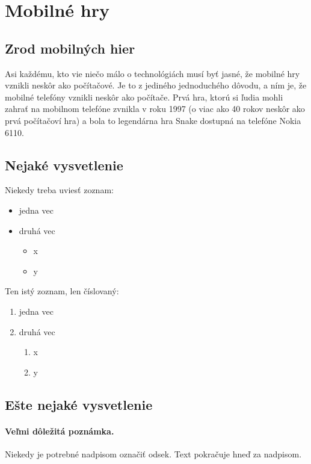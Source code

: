 \documentclass[10pt,twoside,slovak,a4paper]{article}
\begin{document}
\section{Mobilné hry} \label{ina}

\subsection{Zrod mobilných hier}

Asi každému, kto vie niečo málo o technológiách musí byť jasné, že mobilné hry vznikli neskôr ako počítačové. Je to z jediného jednoduchého dôvodu, a ním je, že mobilné telefóny vznikli neskôr ako počítače. Prvá hra, ktorú si ľudia mohli zahrať na mobilnom telefóne zvnikla v roku 1997 (o viac ako 40 rokov neskôr ako prvá počítačoví hra) a bola to legendárna hra Snake dostupná na telefóne Nokia 6110.


\subsection{Nejaké vysvetlenie} \label{ina:nejake}

Niekedy treba uviesť zoznam:

\begin{itemize}
\item jedna vec
\item druhá vec
	\begin{itemize}
	\item x
	\item y
	\end{itemize}
\end{itemize}

Ten istý zoznam, len číslovaný:

\begin{enumerate}
\item jedna vec
\item druhá vec
	\begin{enumerate}
	\item x
	\item y
	\end{enumerate}
\end{enumerate}


\subsection{Ešte nejaké vysvetlenie} \label{ina:este}

\paragraph{Veľmi dôležitá poznámka.}
Niekedy je potrebné nadpisom označiť odsek. Text pokračuje hneď za nadpisom.
\end{document}
